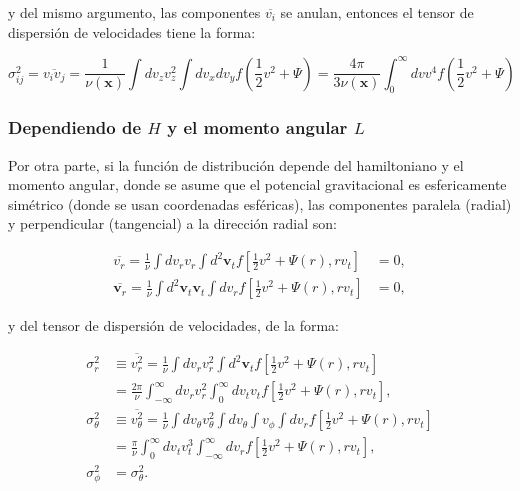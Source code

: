 y del mismo argumento, las componentes $\overline{v_i}$ se anulan, entonces el tensor de dispersión de velocidades tiene la forma:

\begin{equation}
\sigma_{ij}^2 = \overline{v_i v_j} = \frac{1}{\nu(\textbf{x})} \int d v_z  v_z^2 \int d v_x d v_y f \left ( \frac{1}{2} v^2  + \Psi \right ) = \frac{4 \pi}{3 \nu(\textbf{x})}   \int_0^{\infty} d v  v^4  f \left ( \frac{1}{2} v^2  + \Psi \right )
\end{equation}



\subsubsection{Dependiendo de $H$ y el momento angular $L$}

Por otra parte, si la función de distribución depende del hamiltoniano y el momento angular, donde se asume que el potencial gravitacional es esfericamente simétrico (donde se usan coordenadas esféricas), las componentes paralela (radial) y perpendicular (tangencial) a la dirección radial son:

\begin{align}
\overline{v_r} = \frac{1}{\nu} \int d v_r v_r \int d^2 \textbf{v}_t f \left [ \frac{1}{2}v^2  + \Psi (r) , r v_t \right ] &= 0, \\
\overline{\textbf{v}_r} = \frac{1}{\nu} \int d^2 \textbf{v}_t \textbf{v}_t \int d v_r f \left [ \frac{1}{2}v^2  + \Psi (r) , r v_t \right ] &= 0,
\end{align}

y del tensor de dispersión de velocidades, de la forma:

\begin{equation}
\begin{aligned}
\sigma_r^2 &\equiv \overline{v_r^2} = \frac{1}{\nu} \int d v_r v_r^2 \int d^2 \textbf{v}_t  f \left [ \frac{1}{2}v^2  + \Psi (r) , r v_t \right ] \\
& = \frac{2\pi }{\nu} \int_{-\infty}^{\infty} dv_r v_r^2 \int_0^\infty d v_t v_t  f \left [ \frac{1}{2}v^2  + \Psi (r) , r v_t \right ], \\
\sigma_{\theta}^2 &\equiv \overline{v_{\theta}^2} = \frac{1}{\nu} \int d v_\theta v_\theta^2 \int d v_\theta \int v_\phi \int d v_r  f \left [ \frac{1}{2}v^2  + \Psi (r) , r v_t \right ] \\
& = \frac{\pi }{\nu} \int_{0}^{\infty} dv_t v_t^3 \int_{-\infty}^\infty d v_r  f \left [ \frac{1}{2}v^2  + \Psi (r) , r v_t \right ], \\
\sigma_{\phi}^2 & = \sigma_{\theta}^2.
\end{aligned}
\end{equation}

